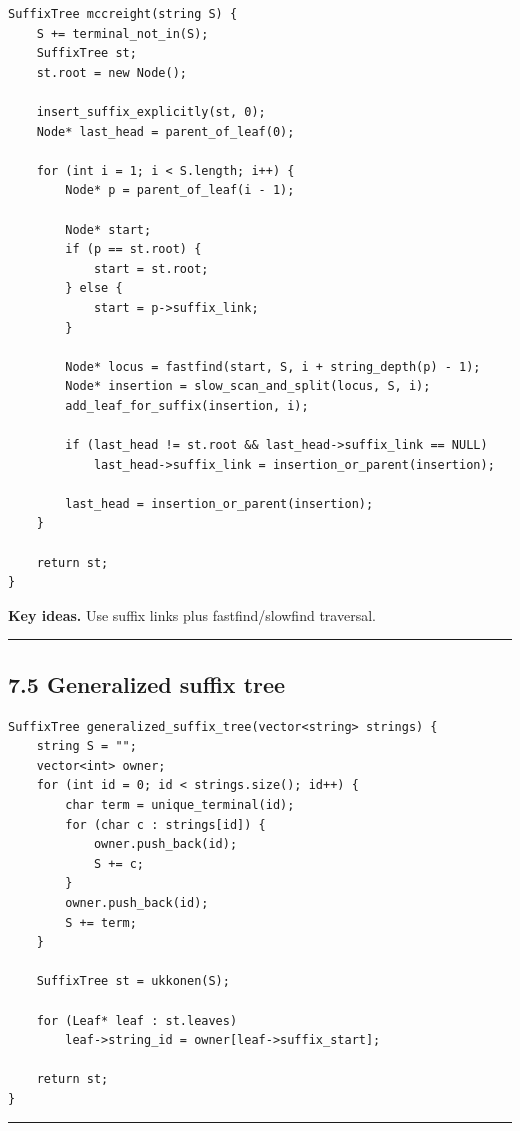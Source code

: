\documentclass[11pt]{article}
\begin{document}
\begin{verbatim}
SuffixTree mccreight(string S) {
    S += terminal_not_in(S);
    SuffixTree st;
    st.root = new Node();

    insert_suffix_explicitly(st, 0);
    Node* last_head = parent_of_leaf(0);

    for (int i = 1; i < S.length; i++) {
        Node* p = parent_of_leaf(i - 1);

        Node* start;
        if (p == st.root) {
            start = st.root;
        } else {
            start = p->suffix_link;
        }

        Node* locus = fastfind(start, S, i + string_depth(p) - 1);
        Node* insertion = slow_scan_and_split(locus, S, i);
        add_leaf_for_suffix(insertion, i);

        if (last_head != st.root && last_head->suffix_link == NULL)
            last_head->suffix_link = insertion_or_parent(insertion);

        last_head = insertion_or_parent(insertion);
    }

    return st;
}
\end{verbatim}

\textbf{Key ideas.} Use suffix links plus fastfind/slowfind traversal.

\begin{center}\rule{0.5\linewidth}{0.5pt}\end{center}

\subsection{7.5 Generalized suffix tree}\label{generalized-suffix-tree}

\begin{verbatim}
SuffixTree generalized_suffix_tree(vector<string> strings) {
    string S = "";
    vector<int> owner;
    for (int id = 0; id < strings.size(); id++) {
        char term = unique_terminal(id);
        for (char c : strings[id]) {
            owner.push_back(id);
            S += c;
        }
        owner.push_back(id);
        S += term;
    }

    SuffixTree st = ukkonen(S);

    for (Leaf* leaf : st.leaves)
        leaf->string_id = owner[leaf->suffix_start];

    return st;
}
\end{verbatim}

\begin{center}\rule{0.5\linewidth}{0.5pt}\end{center}
\end{document}
